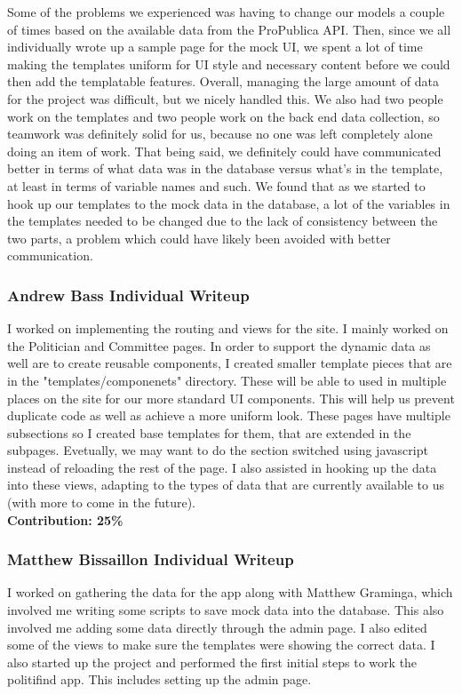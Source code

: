 \documentclass{article}
\newcommand{\n}{\noindent}
\begin{document}
Some of the problems we experienced was having to change our models a couple of times based on the available data from the ProPublica API. Then, since we all individually wrote up a sample page for the mock UI, we spent a lot of time making the templates uniform for UI style and necessary content before we could then add the templatable features. Overall, managing the large amount of data for the project was difficult, but we nicely handled this. We also had two people work on the templates and two people work on the back end data collection, so teamwork was definitely solid for us, because no one was left completely alone doing an item of work. That being said, we definitely could have communicated better in terms of what data was in the database versus what's in the template, at least in terms of variable names and such. We found that as we started to hook up our templates to the mock data in the database, a lot of the variables in the templates needed to be changed due to the lack of consistency between the two parts, a problem which could have likely been avoided with better communication.

\pagebreak

\subsubsection*{Andrew Bass Individual Writeup}
I worked on implementing the routing and views for the site.  I mainly worked on the Politician and Committee pages.  In order to support the dynamic data as well are to create reusable components, I created smaller template pieces that are in the "templates/componenets" directory.  These will be able to used in multiple places on the site for our more standard UI components.  This will help us prevent duplicate code as well as achieve a more uniform look.  These pages have multiple subsections so I created base templates for them, that are extended in the subpages. Evetually, we may want to do the section switched using javascript instead of reloading the rest of the page. I also assisted in hooking up the data into these views, adapting to the types of data that are currently available to us (with more to come in the future).\\

\n\textbf{Contribution: 25\%}

\pagebreak

\subsubsection*{Matthew Bissaillon Individual Writeup}
I worked on gathering the data for the app along with Matthew Graminga, which involved me writing some scripts to save mock data into the database. This also involved me adding some data directly through the admin page. I also edited some of the views to make sure the templates were showing the correct data. I also started up the project and performed the first initial steps to work the politifind app. This includes setting up the admin page. \\
\end{document}
